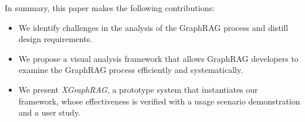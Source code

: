 In summary, this paper makes the following contributions:
\begin{itemize}
\item We identify challenges in the analysis of the GraphRAG process and distill design requirements.
\item We propose a visual analysis framework that allows GraphRAG developers to examine the GraphRAG process efficiently and systematically.
\item We present \textit{XGraphRAG}, a prototype system that instantiates our framework, whose effectiveness is verified with a usage scenario demonstration and a user study.
\end{itemize}